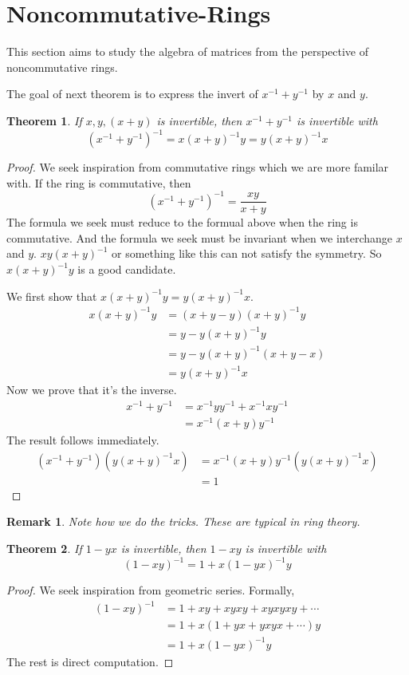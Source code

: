 \documentclass{book}
\newtheorem{theorem}{Theorem}[section]
\newtheorem*{remark}{Remark}
\theoremstyle{definition}
\begin{document}
\section{Noncommutative-Rings}
This section aims to study the algebra of matrices from the perspective of noncommutative rings. \par
The goal of next theorem is to express the invert of $x^{-1}+y^{-1}$ by $x$ and $y$. 
\begin{theorem}
If $x,y,(x+y)$ is invertible, then $x^{-1}+y^{-1}$ is invertible with 
\[(x^{-1}+y^{-1})^{-1}=x(x+y)^{-1}y=y(x+y)^{-1}x\]
\end{theorem}
\begin{proof}
We seek inspiration from commutative rings which we are more familar with. If the ring is commutative, then \[(x^{-1}+y^{-1})^{-1}=\frac{xy}{x+y}\] The formula we seek must reduce to the formual above when the ring is commutative. And the formula we seek must be invariant when we interchange $x$ and $y$. $xy(x+y)^{-1}$ or something like this can not satisfy the symmetry. So $x(x+y)^{-1}y$ is a good candidate.\par
We first show that $x(x+y)^{-1}y=y(x+y)^{-1}x$. 
\begin{align*}
x(x+y)^{-1}y&=(x+y-y)(x+y)^{-1}y\\&=y-y(x+y)^{-1}y\\&=y-y(x+y)^{-1}(x+y-x)\\&=y(x+y)^{-1}x
\end{align*}
Now we prove that it's the inverse.
\begin{align*}
x^{-1}+y^{-1}&=x^{-1}yy^{-1}+x^{-1}xy^{-1}\\&=x^{-1}(x+y)y^{-1}
\end{align*}
The result follows immediately.
\begin{align*}
(x^{-1}+y^{-1})(y(x+y)^{-1}x)&=x^{-1}(x+y)y^{-1}(y(x+y)^{-1}x)\\&=1
\end{align*}
\end{proof}
\begin{remark}
Note how we do the tricks. These are typical in ring theory.
\end{remark}

\begin{theorem}
If $1-yx$ is invertible, then $1-xy$ is invertible with
\[(1-xy)^{-1}=1+x(1-yx)^{-1}y\]
\end{theorem}
\begin{proof}
We seek inspiration from geometric series. Formally,
\begin{align*}
(1-xy)^{-1}&=1+xy+xyxy+xyxyxy+\cdots\\
&=1+x(1+yx+yxyx+\cdots)y\\&=1+x(1-yx)^{-1}y
\end{align*}
The rest is direct computation.
\end{proof}
\end{document}
